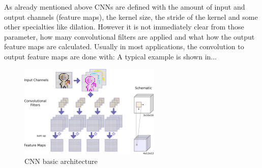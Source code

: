 As already mentioned above CNNs are defined with the amount of input and output channels (feature maps), the kernel size, the stride of the kernel and some other specialties like dilation.
However it is not immediately clear from those parameter, how many convolutional filters are applied and what how the output feature maps are calculated.
Usually in most applications, the convolution to output feature maps are done with:
A typical example is shown in...

\begin{figure}[!ht]
  \centering
    \includegraphics[width=0.6\textwidth]{./4_nn/figs/cnn_basics.eps}
  \caption{CNN basic architecture}
  \label{fig:nn_theory_cnn_basics}
\end{figure}
\FloatBarrier
\noindent

